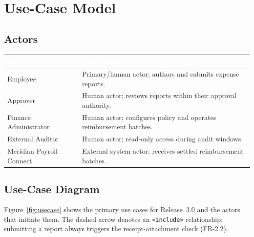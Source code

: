 \section{Use-Case Model}

\subsection{Actors}
\begin{center}
\small
\begin{tabularx}{\textwidth}{@{}l X@{}}
\toprule
\rowcolor{navydark}
\textcolor{white}{\textbf{Actor}} & \textcolor{white}{\textbf{Description}} \\
\midrule
Employee & Primary/human actor; authors and submits expense reports. \\
\rowcolor{lightgray}
Approver & Human actor; reviews reports within their approval authority. \\
Finance Administrator & Human actor; configures policy and operates reimbursement batches. \\
\rowcolor{lightgray}
External Auditor & Human actor; read-only access during audit windows. \\
Meridian Payroll Connect & External system actor; receives settled reimbursement batches. \\
\bottomrule
\end{tabularx}
\end{center}

\subsection{Use-Case Diagram}
Figure~\ref{fig:usecase} shows the primary use cases for Release~3.0 and the actors that
initiate them. The dashed arrow denotes an \texttt{\textless{}include\textgreater{}}
relationship: submitting a report always triggers the receipt-attachment check (FR-2.2).

